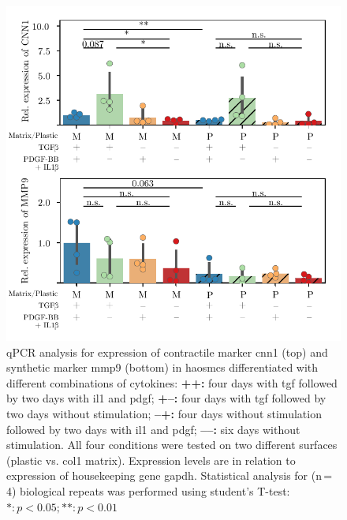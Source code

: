     \begin{figure}[h!]
    \capstart
        \centering
    	\includegraphics{Abbildung/qPCR.pdf}

    	\begin{minipage}{\captionwidth}
    		\caption[CNN_qPCR]{ \newline qPCR analysis for expression of contractile marker \ac{cnn1} (top) and synthetic marker \ac{mmp9} (bottom) in \acp{haosmc} differentiated with different combinations of cytokines:
            \textbf{++:} four days with \ac{tgf} followed by two days with \ac{il1} and \ac{pdgf};
            \textbf{+–:} four days with \ac{tgf} followed by two days without stimulation;
            \textbf{–+:} four days without stimulation followed by two days with \ac{il1} and \ac{pdgf};
            \textbf{––:} six days without stimulation.
            All four conditions were tested on two different surfaces (plastic vs. \ac{col1} matrix). Expression levels are in relation to expression of housekeeping gene \ac{gapdh}. Statistical analysis for (n\,=\,4) biological repeats was performed using student's T-test: $*: p < 0.05; **: p < 0.01$}
    		\label{fig:qPCR_result}
    	\end{minipage}
    \end{figure}

